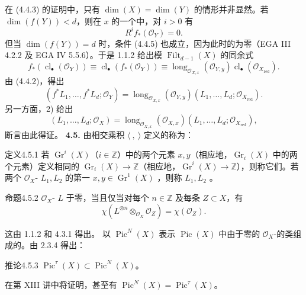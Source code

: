 在 (4.4.3) 的证明中，只有 $\dim(X)=\dim(Y)$ 的情形并非显然。若 $\dim(f(Y))<d$，则在 $x$ 的一个中，对 $i>0$ 有
\[R^if_*(\mathcal O_Y)=0.\tag{4.4.5}\]
但当 $\dim(f(Y))=d$ 时，条件 (4.4.5) 也成立，因为此时的为零（EGA III 4.2.2 及 EGA IV 5.5.6）。于是 1.1.2 给出模 $\operatorname{Filt}_{d-1}(X)$ 的同余式
\[f_*(\operatorname{cl}_\bullet(\mathcal O_Y))\equiv\operatorname{cl}_\bullet(f_*(\mathcal O_Y))\equiv\operatorname{long}_{\mathcal O_{X,x}}(\mathcal O_{Y,y})\operatorname{cl}_\bullet(\mathcal O_{X_{\mathrm{red}}}).\]
由 (4.4.2)，得出
\[(f^*L_1,\ldots,f^*L_d;\mathcal O_Y)=\operatorname{long}_{\mathcal O_{X,x}}(\mathcal O_{Y,y})(L_1,\ldots,L_d;\mathcal O_{X_{\mathrm{red}}}).\]
另一方面，2) 给出
\[(L_1,\ldots,L_d;\mathcal O_X)=\operatorname{long}_{\mathcal O_{X,x}}(\mathcal O_{X,x})(L_1,\ldots,L_d;\mathcal O_{X_{\mathrm{red}}}),\]
断言由此得证。
\textbf{4.5.} 由相交乘积 $\langle\ ,\ \rangle$ 定义的称为：
\begin{SGAresult}{定义}{4.5.1}
若 $\operatorname{Gr}^i(X)$（$i\in\mathbb Z$）中的两个元素 $x,y$（相应地，$\operatorname{Gr}_i(X)$ 中的两个元素）定义相同的 $\operatorname{Gr}_i(X)\longrightarrow\mathbb Z$（相应地，$\operatorname{Gr}^i(X)\longrightarrow\mathbb Z$），则称它们。若两个 $\mathcal O_X$- $L_1,L_2$ 的第一  $x,y\in\operatorname{Gr}^1(X)$ ，则称 $L_1,L_2$ 。
\end{SGAresult}
\begin{SGAresult}{命题}{4.5.2}
 $\mathcal O_X$- $L$ 于零，当且仅当对每个 $n\in\mathbb Z$ 及每条 $Z\subset X$，有
\[\chi(L^{\otimes n}\otimes_{\mathcal O_X}\mathcal O_Z)=\chi(\mathcal O_Z).\tag{4.5.3}\]
\end{SGAresult}
这由 1.1.2 和 4.3.1 得出。
以 $\operatorname{Pic}^N(X)$ 表示 $\operatorname{Pic}(X)$ 中由于零的 $\mathcal O_X$-的类组成的。由 2.3.4 得出：
\begin{SGAresult}{推论}{4.5.3}
$\operatorname{Pic}^\tau(X)\subset\operatorname{Pic}^N(X)$。
\end{SGAresult}
在第 XIII 讲中将证明，甚至有 $\operatorname{Pic}^N(X)=\operatorname{Pic}^\tau(X)$。

